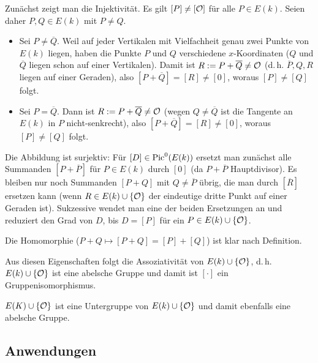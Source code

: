 \begin{Beweis}
    Zunächst zeigt man die Injektivität.
    Es gilt $[P] \not= [\mathcal{O}]$ für alle $P \in E(k)$.
    Seien daher $P, Q \in E(k)$ mit $P \not= Q$.
    \begin{itemize}
        \item
        Sei $P \not= \overline{Q}$.
        Weil auf jeder Vertikalen mit Vielfachheit genau zwei Punkte von $E(k)$ liegen,
        haben die Punkte $P$ und $Q$ verschiedene $x$-Koordinaten
        ($Q$ und $\overline{Q}$ liegen schon auf einer Vertikalen).
        Damit ist $R := P + \overline{Q} \not= \mathcal{O}$
        (d.\,h. $\overline{P}, Q, R$ liegen auf einer Geraden),
        also $[P + \overline{Q}] = [R] \not= [0]$, woraus $[P] \not= [Q]$ folgt.

        \item
        Sei $P = \overline{Q}$.
        Dann ist $R := P + \overline{Q} \not= \mathcal{O}$
        (wegen $Q \not= \overline{Q}$ ist die Tangente an $E(k)$ in $P$ nicht-senkrecht),
        also $[P + \overline{Q}] = [R] \not= [0]$, woraus $[P] \not= [Q]$ folgt.
    \end{itemize}
    Die Abbildung ist surjektiv:
    Für $[D] \in \operatorname{Pic}^0(E(k))$ ersetzt man zunächst alle Summanden $[P + \overline{P}]$ für
    $P \in E(k)$ durch $[0]$ (da $P + \overline{P}$ Hauptdivisor).
    Es bleiben nur noch Summanden $[P + Q]$ mit $Q \not= \overline{P}$ übrig,
    die man durch $[\overline{R}]$ ersetzen kann (wenn $R \in E(k) \cup \{\mathcal{O}\}$ der eindeutige
    dritte Punkt auf einer Geraden ist).
    Sukzessive wendet man eine der beiden Ersetzungen an und reduziert den Grad von $D$,
    bis $D = [P]$ für ein $P \in E(k) \cup \{\mathcal{O}\}$.

    Die Homomorphie ($P + Q \mapsto [P + Q] = [P] + [Q]$) ist klar nach Definition.

    Aus diesen Eigenschaften folgt die Assoziativität von $E(k) \cup \{\mathcal{O}\}$, d.\,h.
    $E(k) \cup \{\mathcal{O}\}$ ist eine abelsche Gruppe und damit ist $[\cdot]$ ein Gruppenisomorphismus.
\end{Beweis}

\linie

$E(K) \cup \{\mathcal{O}\}$ ist eine Untergruppe von $E(k) \cup \{\mathcal{O}\}$ und damit ebenfalls eine
abelsche Gruppe.

\pagebreak

\subsection{%
    Anwendungen%
}


